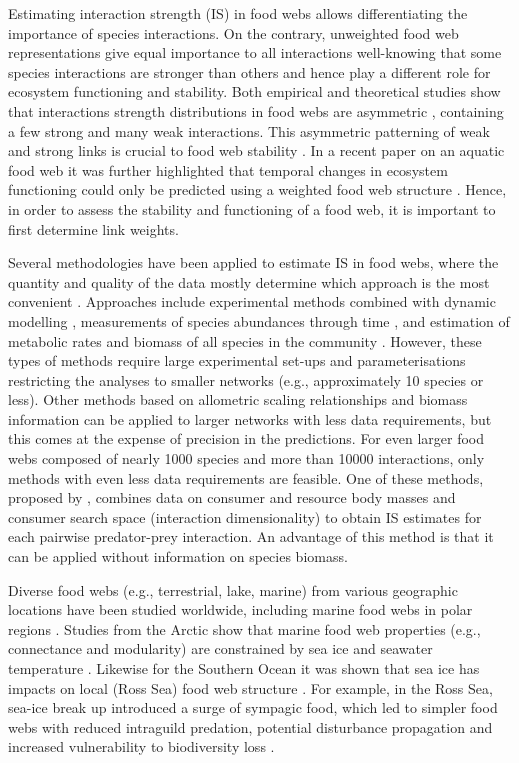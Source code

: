 \documentclass[gc, manuscript]{copernicus}
\begin{document}
Estimating interaction strength (IS) in food webs allows differentiating
the importance of species interactions. On the contrary, unweighted food
web representations give equal importance to all interactions
well-knowing that some species interactions are stronger than others and
hence play a different role for ecosystem functioning and stability.
Both empirical and theoretical studies show that interactions strength
distributions in food webs are asymmetric
\citep{Paine1992, McCann1998, Emmerson2004, Wootton2005, Kortsch2021},
containing a few strong and many weak interactions. This asymmetric
patterning of weak and strong links is crucial to food web stability
\citep{Paine1992, McCann1998, Neutel2002}. In a recent paper on an
aquatic food web it was further highlighted that temporal changes in
ecosystem functioning could only be predicted using a weighted food web
structure \citep{Kortsch2021}. Hence, in order to assess the stability
and functioning of a food web, it is important to first determine link
weights.

Several methodologies have been applied to estimate IS in food webs,
where the quantity and quality of the data mostly determine which
approach is the most convenient \citep{Berlow2004}. Approaches include
experimental methods combined with dynamic modelling
\citep{Emmerson2004, Carrara2015}, measurements of species abundances
through time \citep{Fahimipour2014, Chang2021}, and estimation of
metabolic rates and biomass of all species in the community
\citep{Neutel2014}. However, these types of methods require large
experimental set-ups and parameterisations restricting the analyses to
smaller networks (e.g., approximately 10 species or less). Other methods
based on allometric scaling relationships and biomass information
\citep{Kortsch2021, Gauzens2019} can be applied to larger networks with
less data requirements, but this comes at the expense of precision in
the predictions. For even larger food webs composed of nearly 1000
species and more than 10000 interactions, only methods with even less
data requirements are feasible. One of these methods, proposed by
\citet{Pawar2012}, combines data on consumer and resource body masses
and consumer search space (interaction dimensionality) to obtain IS
estimates for each pairwise predator-prey interaction. An advantage of
this method is that it can be applied without information on species
biomass.

Diverse food webs (e.g., terrestrial, lake, marine) from various
geographic locations have been studied worldwide, including marine food
webs in polar regions
\citep{Carscallen2012, Santana2013, Kortsch2019, Pecuchet2022}. Studies
from the Arctic show that marine food web properties (e.g., connectance
and modularity) are constrained by sea ice and seawater temperature
\citep{Kortsch2019, Pecuchet2022}. Likewise for the Southern Ocean it
was shown that sea ice has impacts on local (Ross Sea) food web
structure \citep{Rossi2019}. For example, in the Ross Sea, sea-ice break
up introduced a surge of sympagic food, which led to simpler food webs
with reduced intraguild predation, potential disturbance propagation and
increased vulnerability to biodiversity loss \citep{Rossi2019}.
\end{document}
